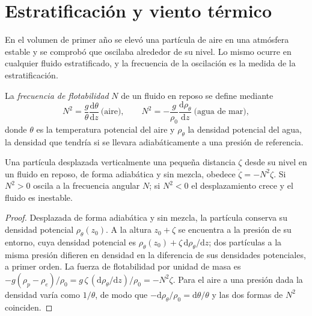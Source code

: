 \section{Estratificación y viento térmico}\label{sec:b3:gfd-foundations:stratification}

En el volumen de primer año se elevó una partícula de aire en una atmósfera estable y se comprobó
que oscilaba alrededor de su nivel. Lo mismo ocurre en cualquier fluido estratificado,
y la frecuencia de la oscilación es la medida de la estratificación.

\begin{definition}\label{def:b3:gfd-foundations:buoyancy}
La \emph{frecuencia de flotabilidad} $N$ de un fluido en
reposo se define mediante
\[
N^2 = \frac{g}{\theta}\frac{\mathrm d\theta}{\mathrm dz}\ \text{(aire)},
\qquad
N^2 = -\frac{g}{\rho_0}\frac{\mathrm d\rho_\theta}{\mathrm dz}\ \text{(agua de mar)},
\]
donde $\theta$ es la temperatura potencial del aire y $\rho_\theta$ la
densidad potencial del agua, la densidad que tendría si se llevara
adiabáticamente a una presión de referencia.
\end{definition}

\begin{theorem}\label{thm:b3:gfd-foundations:buoyancy}
Una partícula desplazada verticalmente una pequeña distancia $\zeta$ desde su nivel en un
fluido en reposo, de forma adiabática y sin mezcla, obedece $\ddot\zeta =
-N^2\zeta$. Si $N^2 > 0$ oscila a la frecuencia angular $N$; si
$N^2 < 0$ el desplazamiento crece y el fluido es inestable.
\end{theorem}

\begin{proof}
Desplazada de forma adiabática y sin mezcla, la partícula conserva su densidad
potencial $\rho_\theta(z_0)$. A la altura $z_0 + \zeta$ se encuentra a la presión
de su entorno, cuya densidad potencial es $\rho_\theta(z_0) +
\zeta\,\mathrm d\rho_\theta/\mathrm dz$; dos partículas a la misma presión
difieren en densidad en la diferencia de sus densidades potenciales, a primer
orden. La fuerza de flotabilidad por unidad de masa es $-g(\rho_p - \rho_e)/\rho_0 =
g\,\zeta\,(\mathrm d\rho_\theta/\mathrm dz)/\rho_0 = -N^2\zeta$. Para el aire a una
presión dada la densidad varía como $1/\theta$, de modo que $-\mathrm
d\rho_\theta/\rho_0 = \mathrm d\theta/\theta$ y las dos formas de $N^2$
coinciden.
\end{proof}

